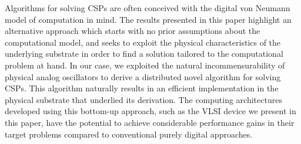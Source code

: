 \documentclass[10pt]{article}
\begin{document}
Algorithms for solving CSPs are often conceived with the digital von Neumann model of computation in mind. The results presented in this paper highlight an alternative approach which starts with no prior assumptions about the computational model, and seeks to exploit the physical characteristics of the underlying substrate in order to find a solution tailored to the computational problem at hand. In our case, we exploited the natural incommensurability of physical analog oscillators to derive a distributed novel algorithm for solving CSPs. This algorithm naturally results in an efficient implementation in the physical substrate that underlied its derivation. The computing architectures developed using this bottom-up approach, such as the VLSI device we present in this paper, have the potential to achieve considerable performance gains in their target problems compared to conventional purely digital approaches. 
\end{document}
